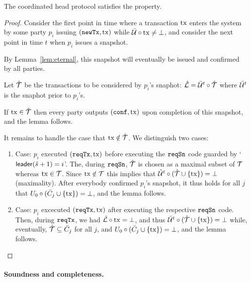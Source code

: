 \begin{lemma}[Liveness]
  \label{lem:liveness}
  The coordinated head protocol satisfies the  property.
\end{lemma}
\begin{proof}
  Consider the first point in time where a transaction $\mathrm{tx}$ enters the system by some party $p_i$
  issuing $(\mathtt{newTx},\mathrm{tx})$ while $\bar {\mathcal U}\circ\mathrm{tx}\not=\bot$, and consider the next point in time
  $t$ when $p_i$ issues a snapshot.

  By Lemma~\ref{lem:eternal}, this snapshot will eventually be issued and confirmed by all parties.
  
  \medskip
  
  Let $\hat {\mathcal T}$ be the transactions to be considered by $p_i$'s snaphot: $\hat {\mathcal L}=\bar {\mathcal U}^{t}\circ\hat {\mathcal T}$
  where $\bar {\mathcal U}^{t}$ is the snaphot prior to $p_i$'s.

  \medskip
  
  If $\mathrm{tx}\in\hat {\mathcal T}$ then every party outputs $(\mathtt{conf},\mathrm{tx})$ upon completion of this snapshot, and
  the lemma follows.

  \medskip
  
  It remains to handle the case that $\mathrm{tx}\notin\hat {\mathcal T}$. We distinguish two cases:
  \begin{enumerate}
  \item %
     Case: $p_i$ executed $(\mathtt{reqTx},\mathrm{tx})$ before executing the $\mathtt{reqSn}$ code guarded
     by `$\mathsf{leader}(\hat s+1)=i$'.
     The, during $\mathtt{reqSn}$, $\hat {\mathcal T}$ is chosen as a maximal subset of ${\mathcal T}$ whereas $\mathrm{tx}\in{\mathcal T}$.
     Since $\mathrm{tx}\notin{\mathcal T}$ this implies that $\hat {\mathcal U}^{t}\circ(\hat {\mathcal T}\cup\{\mathrm{tx}\})=\bot$ (maximality).
     After everybody confirmed $p_i$'s snapshot, it thus holds for all $j$ that
     $U_0\circ(\bar{C}_j\cup\{\mathrm{tx}\})=\bot$, and the lemma follows.
   \item %
     Case: $p_i$ excecuted $(\mathtt{reqTx},\mathrm{tx})$ after executing the respective $\mathtt{reqSn}$ code.
     Then, during $\mathtt{reqTx}$, we had $\hat {\mathcal L}\circ\mathrm{tx}=\bot$, and thus
     $\bar {\mathcal U}^{t}\circ(\hat {\mathcal T}\cup\{\mathrm{tx}\})=\bot$ while, eventually,
     $\hat {\mathcal T}\subseteq\bar{C}_j$ for all $j$, and
     $U_0\circ(\bar{C}_j\cup\{\mathrm{tx}\})=\bot$, and the lemma follows.\qedhere  
  \end{enumerate}
\end{proof}

\paragraph{Soundness and completeness.}


